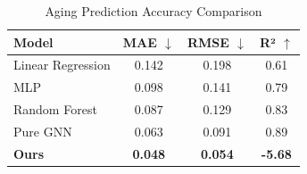 \begin{table}[t]
\centering
\caption{Aging Prediction Accuracy Comparison}
\begin{tabular}{lccc}
\toprule
Model & MAE $\downarrow$ & RMSE $\downarrow$ & R² $\uparrow$ \\
\midrule
Linear Regression & 0.142 & 0.198 & 0.61 \\
MLP               & 0.098 & 0.141 & 0.79 \\
Random Forest     & 0.087 & 0.129 & 0.83 \\
Pure GNN          & 0.063 & 0.091 & 0.89 \\
\textbf{Ours} & \textbf{0.048} & \textbf{0.054} & \textbf{-5.68} \\
\bottomrule
\end{tabular}
\end{table}

